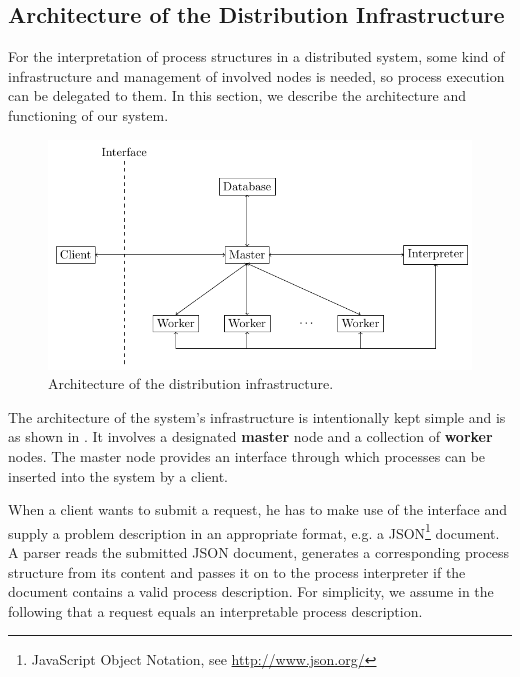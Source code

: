 \subsection{Architecture of the Distribution Infrastructure}
\label{chp:infrastructure}
For the interpretation of process structures in a distributed system, some kind of infrastructure and management of involved nodes is needed, so process execution can be delegated to them. In this section, we describe the architecture and functioning of our system.
\vspace*{-0.5em}
\begin{figure}[h!]
  \centering
  \includegraphics[width=\textwidth]{img/architecture.pdf}
  \caption{Architecture of the distribution infrastructure.}
  \vspace*{-0.5em}
  \label{fig:architecture}
\end{figure}

The architecture of the system's infrastructure is intentionally kept simple and is as shown in . It involves a designated \textbf{master} node and a collection of \textbf{worker} nodes. The master node provides an interface through which processes can be inserted into the system by a client.

When a client wants to submit a request, he has to make use of the interface and supply a problem description in an appropriate format, e.g. a JSON\footnote{JavaScript Object Notation, see \url{http://www.json.org/}} document. A parser reads the submitted JSON document, generates a corresponding process structure from its content and passes it on to the process interpreter if the document contains a valid process description. For simplicity, we assume in the following that a request equals an interpretable process description.

